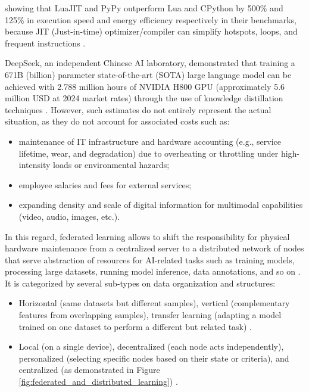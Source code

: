 showing that LuaJIT and PyPy outperform Lua and CPython by 500\% and 125\% in execution speed and energy efficiency respectively in their benchmarks, because JIT (Just-in-time) optimizer/compiler can simplify hotspots, loops, and frequent instructions \cite[pp. 7–8]{vankempen2025not}.

DeepSeek, an independent Chinese AI laboratory, demonstrated that training a 671B (billion) parameter state-of-the-art (SOTA) large language model can be achieved with 2.788 million hours of NVIDIA H800 GPU (approximately 5.6 million USD at 2024 market rates) through the use of knowledge distillation techniques \cite{deepseekai2025deepseekv3}. However, such estimates do not entirely represent the actual situation, as they do not account for associated costs such as:
\begin{itemize}
    \item maintenance of IT infrastructure and hardware accounting (e.g., service lifetime, wear, and degradation) due to overheating or throttling under high-intensity loads or environmental hazards;
    \item employee salaries and fees for external services;
    \item expanding density and scale of digital information for multimodal capabilities (video, audio, images, etc.).
\end{itemize}

In this regard, federated learning allows to shift the responsibility for physical hardware maintenance from a centralized server to a distributed network of nodes that serve abstraction of resources for AI-related tasks such as training models, processing large datasets, running model inference, data annotations, and so on \cite{yurdem2024federated}. It is categorized by several sub-types on data organization and structures:
\begin{itemize}
    \item Horizontal (same datasets but different samples), vertical (complementary features from overlapping samples), transfer learning (adapting a model trained on one dataset to perform a different but related task) \cite[Ch. 2–3]{yurdem2024federated}.
    \item Local (on a single device), decentralized (each node acts independently), personalized (selecting specific nodes based on their state or criteria), and centralized (as demonstrated in Figure \ref{fig:federated_and_distributed_learning}) \cite[Sec. 2.1-2.3]{li2020federated}.
\end{itemize}


